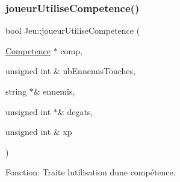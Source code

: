 \subsubsection{\texorpdfstring{joueur\+Utilise\+Competence()}{joueurUtiliseCompetence()}}
{\footnotesize\ttfamily bool Jeu\+::joueur\+Utilise\+Competence (\begin{DoxyParamCaption}\item[{\mbox{\hyperlink{structCompetence}{Competence}} $\ast$}]{comp,  }\item[{unsigned int \&}]{nb\+Ennemis\+Touches,  }\item[{string $\ast$\&}]{ennemis,  }\item[{unsigned int $\ast$\&}]{degats,  }\item[{unsigned int \&}]{xp }\end{DoxyParamCaption})}



Fonction\+: Traite l\textquotesingle{}utilisation d\textquotesingle{}une compétence. 

